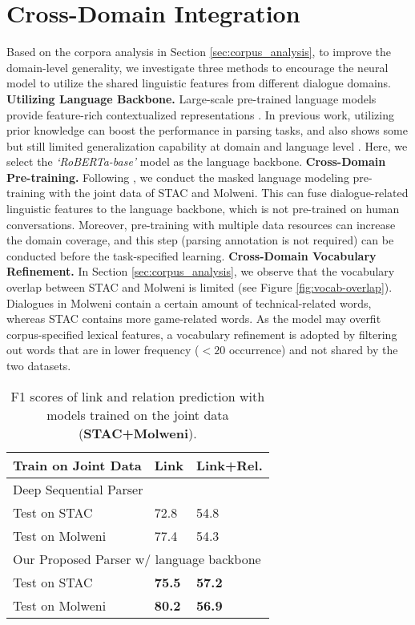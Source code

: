 \documentclass[11pt]{article}
\begin{document}
\section{Cross-Domain Integration}
Based on the corpora analysis in Section \ref{sec:corpus_analysis}, to improve the domain-level generality, we investigate three methods to encourage the neural model to utilize the shared linguistic features from different dialogue domains.
\newline\noindent \textbf{Utilizing Language Backbone.}
Large-scale pre-trained language models provide feature-rich contextualized representations \cite{devlin-2019-BERT}. In previous work, utilizing prior knowledge can boost the performance in parsing tasks, and also shows some but still limited generalization capability at domain and language level \cite{liu2020multiRST}.
Here, we select the \textit{`RoBERTa-base'} model \citep{liu2019roberta} as the language backbone.
\newline\noindent \textbf{Cross-Domain Pre-training.}
Following \citet{dontstoppretraining2020}, we conduct the masked language modeling pre-training with the joint data of STAC and Molweni. This can fuse dialogue-related linguistic features to the language backbone, which is not pre-trained on human conversations. Moreover, pre-training with multiple data resources can increase the domain coverage, and this step (parsing annotation is not required) can be conducted before the task-specified learning.
\newline\noindent \textbf{Cross-Domain Vocabulary Refinement.}
In Section \ref{sec:corpus_analysis}, we observe that the vocabulary overlap between STAC and Molweni is limited (see Figure \ref{fig:vocab-overlap}). Dialogues in Molweni contain a certain amount of technical-related words, whereas STAC contains more game-related words. As the model may overfit corpus-specified lexical features, a vocabulary refinement is adopted by filtering out words that are in lower frequency ($<20$ occurrence) and not shared by the two datasets.

\begin{table}[t!]
\linespread{1.0}
\centering
\small
\begin{tabular}{p{3.2cm}p{1.5cm}<{\centering}p{1.5cm}<{\centering}}
\toprule
\textbf{Train on Joint Data}  & \textbf{Link} & \textbf{Link+Rel.} \\
\midrule
\multicolumn{3}{l}{Deep Sequential Parser \cite{shi2019deepSeqParser}} \\
Test on STAC & 72.8 & 54.8 \\
Test on Molweni & 77.4 & 54.3 \\
\midrule
\multicolumn{3}{l}{Our Proposed Parser w/ language backbone} \\
Test on STAC & \textbf{75.5} & \textbf{57.2} \\
Test on Molweni & \textbf{80.2} & \textbf{56.9} \\
\bottomrule
\end{tabular}
\caption{\label{result-join-table} F1 scores of link and relation prediction with models trained on the joint data (\textbf{STAC+Molweni}).}
\end{table}
\end{document}
